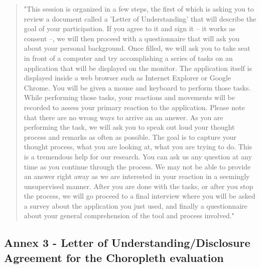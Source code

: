 \documentclass[twocolumn, letterpaper,13pt]{scrartcl}
\begin{document}
    \begin{quote}
        "This session is organized in a few steps, the first of which is asking you to review a document called a 'Letter of Understanding' that will describe the goal of your participation. If you agree to it and sign it -- it works as consent --, we will then proceed with a questionnaire that will ask you about your personal background. Once filled, we will ask you to take seat in front of a computer and try accomplishing a series of tasks on an application that will be displayed on the monitor. The application itself is displayed inside a web browser such as Internet Explorer or Google Chrome. You will be given a mouse and keyboard to perform those tasks. 
        \newline\newline
        While performing those tasks, your reactions and movements will be recorded to assess your primary reaction to the application. Please note that there are no wrong ways to arrive an an answer. As you are performing the task, we will ask you to speak out loud your thought process and remarks as often as possible. The goal is to capture your thought process, what you are looking at, what you are trying to do. This is a tremendous help for our research.
        \newline\newline
        You can ask us any question at any time as you continue through the process. We may not be able to provide an answer right away as we are interested in your reaction in a seemingly unsupervised manner.
        \newline\newline
        After you are done with the tasks, or after you stop the process, we will go proceed to a final interview where you will be asked a survey about the application you just used, and finally a questionnaire about your general comprehension of the tool and process involved."
    \end{quote}
    
    \subsection*{Annex 3 - Letter of Understanding/Disclosure Agreement for the Choropleth evaluation}
    
\end{document}
